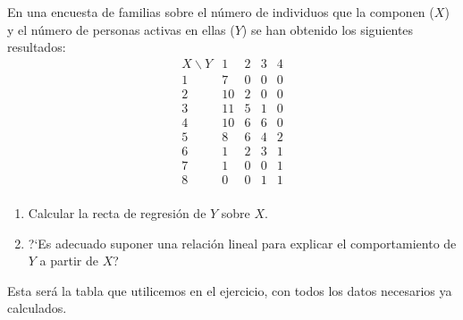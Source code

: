 \problem

En una encuesta de  familias sobre el n{\'u}mero  de  individuos
que  la componen ($X$) y el n{\'u}mero de personas activas en ellas
($Y$)  se  han obtenido los siguientes resultados:
$$
    \begin{array}{c|cccc}
          X \backslash Y &   1 &  2 &  3  & 4 \\ \hline
           1    &   7 &  0 &  0  & 0  \\
           2    &  10 &  2 &  0  & 0  \\
           3    &  11 &  5 &  1  & 0  \\
           4    &  10 &  6 &  6  & 0  \\
           5    &   8 &  6 &  4  & 2  \\
           6    &   1 &  2 &  3  & 1  \\
           7    &   1 &  0 &  0  & 1  \\
           8    &   0 &  0 &  1  & 1  \\
     \end{array}
$$

  \begin{enumerate}

     \item Calcular la recta de regresi\'on de $Y$ sobre $X$.
  \item
   ?`Es adecuado suponer una relaci\'on lineal para explicar el comportamiento de $Y$ a partir de $X$?
  \end{enumerate}

\subproblem
Esta será la tabla que utilicemos en el ejercicio, con todos los datos necesarios ya calculados.

